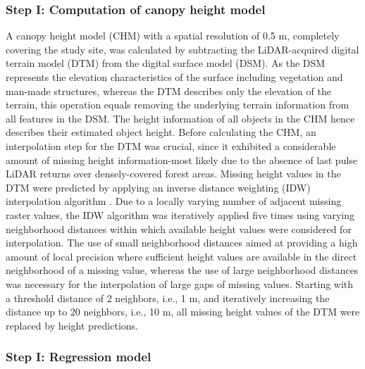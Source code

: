 \subsubsection{Step I: Computation of canopy height model}
\label{sec:step1}

A canopy height model (CHM) with a spatial resolution of 0.5 m, completely covering the study site, was calculated by subtracting the LiDAR-acquired digital terrain model (DTM) from the digital surface model (DSM). As the DSM represents the elevation characteristics of the surface including vegetation and man-made structures, whereas the DTM describes only the elevation of the terrain, this operation equals removing the underlying terrain information from all features in the DSM. The height information of all objects in the CHM hence describes their estimated object height. Before calculating the CHM, an interpolation step for the DTM was crucial, since it exhibited a considerable amount of missing height information-most likely due to the absence of last pulse LiDAR returns over densely-covered forest areas. Missing height values in the DTM were predicted by applying an inverse distance weighting (IDW) interpolation algorithm \citep{isaaks1989}. Due to a locally varying number of adjacent missing raster values, the IDW algorithm was iteratively applied five times using varying neighborhood distances within which available height values were considered for interpolation. The use of small neighborhood distances aimed at providing a high amount of local precision where sufficient height values are available in the direct neighborhood of a missing value, whereas the use of large neighborhood distances was necessary for the interpolation of large gaps of missing values. Starting with a threshold distance of 2 neighbors, i.e., 1 m, and iteratively increasing the distance up to 20 neighbors, i.e., 10 m, all missing height values of the DTM were replaced by height predictions.

\subsubsection{Step I: Regression model}
\label{sec:step1regmod}

